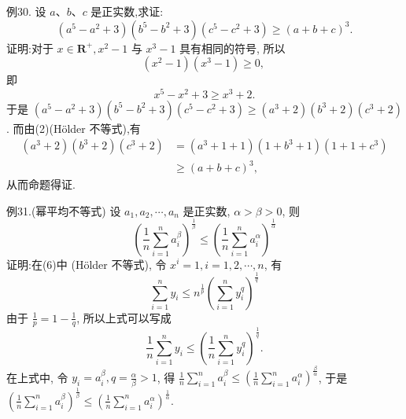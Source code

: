 例30. 设 $a 、 b 、 c$ 是正实数,求证:
$$
\left(a^5-a^2+3\right)\left(b^5-b^2+3\right)\left(c^5-c^2+3\right) \geqslant(a+b+c)^3 .
$$
证明:对于 $x \in \mathbf{R}^{+}, x^2-1$ 与 $x^3-1$ 具有相同的符号, 所以
$$
\left(x^2-1\right)\left(x^3-1\right) \geqslant 0 \text {, }
$$
即
$$
x^5-x^2+3 \geqslant x^3+2 .
$$
于是 $\left(a^5-a^2+3\right)\left(b^5-b^2+3\right)\left(c^5-c^2+3\right) \geqslant\left(a^3+2\right)\left(b^3+2\right)\left(c^3+2\right)$.
而由(2)(Hölder 不等式),有
$$
\begin{aligned}
\left(a^3+2\right)\left(b^3+2\right)\left(c^3+2\right) & =\left(a^3+1+1\right)\left(1+b^3+1\right)\left(1+1+c^3\right) \\
& \geqslant(a+b+c)^3,
\end{aligned}
$$
从而命题得证.



例31.(幂平均不等式) 设 $a_1, a_2, \cdots, a_n$ 是正实数, $\alpha>\beta>0$, 则
$$
\left(\frac{1}{n} \sum_{i=1}^n a_i^\beta\right)^{\frac{1}{\beta}} \leqslant\left(\frac{1}{n} \sum_{i=1}^n a_i^\alpha\right)^{\frac{1}{\alpha}}
$$
证明:在(6)中 (Hölder 不等式), 令 $x^i=1, i=1,2, \cdots, n$, 有
$$
\sum_{i=1}^n y_i \leqslant n^{\frac{1}{p}}\left(\sum_{i=1}^n y_i^q\right)^{\frac{1}{q}}
$$
由于 $\frac{1}{p}=1-\frac{1}{q}$, 所以上式可以写成
$$
\frac{1}{n} \sum_{i=1}^n y_i \leqslant\left(\frac{1}{n} \sum_{i=1}^n y_i^q\right)^{\frac{1}{q}} .
$$
在上式中, 令 $y_i=a_i^\beta, q=\frac{\alpha}{\beta}>1$, 得 $\frac{1}{n} \sum_{i=1}^n a_i^\beta \leqslant\left(\frac{1}{n} \sum_{i=1}^n a_i^\alpha\right)^{\frac{\beta}{\alpha}}$, 于是 $\left(\frac{1}{n} \sum_{i=1}^n a_i^\beta\right)^{\frac{1}{\beta}} \leqslant\left(\frac{1}{n} \sum_{i=1}^n a_i^\alpha\right)^{\frac{1}{\alpha}}$.


